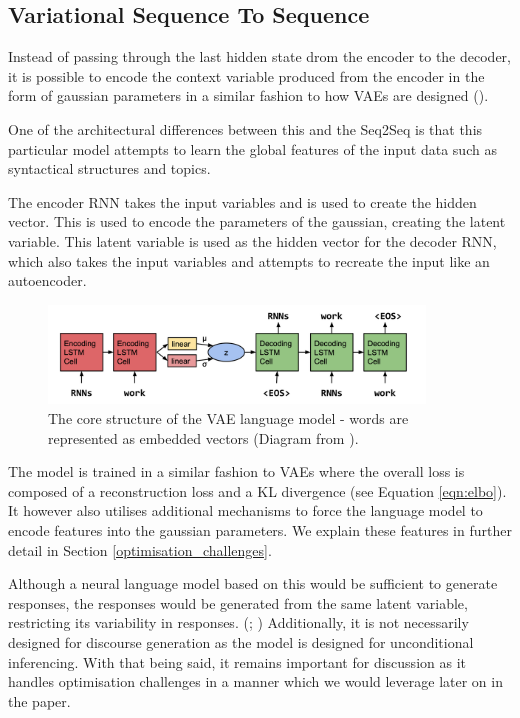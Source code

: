 \documentclass[12pt,twoside]{report}
\begin{document}
\subsection{Variational Sequence To Sequence}
\label{variational_context}

Instead of passing through the last hidden state drom the encoder to the decoder, it is possible to encode the context variable produced from the encoder in the form of gaussian parameters in a similar fashion to how VAEs are designed (\cite{bowman_generating_2015}). 

One of the architectural differences between this and the Seq2Seq is that this particular model attempts to learn the global features of the input data such as syntactical structures and topics.

The encoder RNN takes the input variables and is used to create the hidden vector. This is used to encode the parameters of the gaussian, creating the latent variable. This latent variable is used as the hidden vector for the decoder RNN, which also takes the input variables and attempts to recreate the input like an autoencoder.


\begin{figure}[!ht]
	\centering
	\includegraphics[width=100mm]{diagrams/seq2seqvae.png}
	\caption{The core structure of the VAE language model - words are represented as embedded vectors (Diagram from \cite{bowman_generating_2015}). \label{vae_seq2seq}}
\end{figure}

The model is trained in a similar fashion to VAEs where the overall loss is composed of a reconstruction loss and a KL divergence (see Equation \ref{eqn:elbo}). It however also utilises additional mechanisms to force the language model to encode features into the gaussian parameters. We explain these features in further detail in Section \ref{optimisation_challenges}.

Although a neural language model based on this would be sufficient to generate responses, the responses would be generated from the same latent variable, restricting its variability in responses.  (\cite{zhao_learning_2017}; \cite{du_variational_2018}) Additionally, it is not necessarily designed for discourse generation as the model is designed for unconditional inferencing. With that being said, it remains important for discussion as it handles optimisation challenges in a manner which we would leverage later on in the paper.
\end{document}
